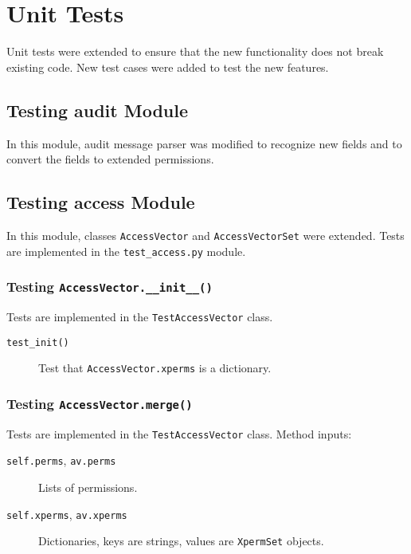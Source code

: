 \section{Unit Tests}

Unit tests were extended to ensure that the new functionality does not break
existing code. New test cases were added to test the new features.

\subsection{Testing audit Module}

In this module, audit message parser was modified to recognize new fields and to
convert the fields to extended permissions.

\subsection{Testing access Module}

In this module, classes \texttt{AccessVector} and \texttt{AccessVectorSet} were
extended. Tests are implemented in the \texttt{test\_access.py} module.

\subsubsection{Testing \texttt{AccessVector.\_\_init\_\_()}}
Tests are implemented in the \texttt{TestAccessVector} class.

\begin{description}
    \item [\texttt{test\_init()}] Test that
        \texttt{AccessVector.xperms} is a dictionary.
\end{description}

\subsubsection{Testing \texttt{AccessVector.merge()}}
Tests are implemented in the \texttt{TestAccessVector} class. Method inputs:
\begin{description}
    \item [\texttt{self.perms}, \texttt{av.perms}] Lists of permissions.
    \item [\texttt{self.xperms}, \texttt{av.xperms}] Dictionaries, keys are
        strings, values are \texttt{XpermSet} objects.
\end{description}

